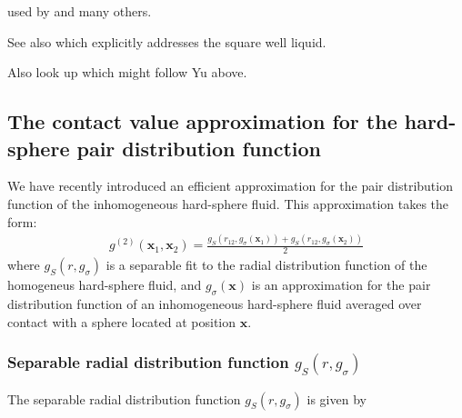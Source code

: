 \documentclass[letterpaper,twocolumn,amsmath,amssymb,pre,aps,10pt]{revtex4-1}
\newcommand\rr{\mathbf{x}}
\begin{document}
\cite{peng2008meanfield} used by
\cite{sundararaman2013efficient} and many others.

See also \cite{yu2009novel} which explicitly addresses the square well
liquid.

Also look up \cite{shen2013hybrid} which might follow Yu above.

\subsection{The contact value approximation for the hard-sphere pair distribution function}

We have recently introduced an efficient approximation for the pair
distribution function of the inhomogeneous hard-sphere fluid.  This
approximation takes the form:
\begin{align}
  g^{(2)}(\rr_1,\rr_2) = \frac{g_S(r_{12}, g_\sigma(\rr_1)) +
    g_S(r_{12}, g_\sigma(\rr_2))}{2} \label{eq:g2-our-mean}
\end{align}
where $g_S(r,g_\sigma)$ is a separable fit to the radial distribution
function of the homogeneus hard-sphere fluid, and $g_\sigma(\rr)$ is
an approximation for the pair distribution function of an
inhomogeneous hard-sphere fluid averaged over contact with a sphere
located at position $\rr$.

\subsubsection{Separable radial distribution function
  $g_S(r,g_\sigma)$}

The separable radial distribution function $g_S(r,g_\sigma)$ is given
by
\newcommand\kappaO{\kappa_0}
\newcommand\kappaI{\kappa_1}
\newcommand\kappaZ{\kappa_2}
\newcommand\kappazero{3.68}
\newcommand\kappaone{2.16}
\newcommand\kappatwo{2.79}
\end{document}
